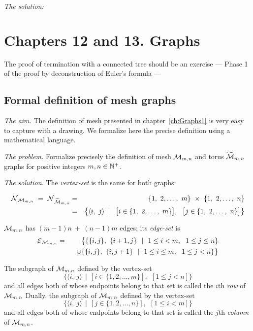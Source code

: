 \noindent \textit{The solution:}





\section{Chapters 12 and 13. Graphs}


{\Arny The proof of termination with a connected tree should be an
  exercise --- Phase 1 of the proof by deconstruction of Euler's
  formula} ---


\subsection{Formal definition of mesh graphs}
\label{Exercice:FormalDefinitionMesh}

\noindent \textit{The aim.}
The definition of mesh presented in chapter~\ref{ch:Graphs1}
is very easy to capture with a drawing.
We formalize here the precise definition using a mathematical language. 
\medskip

\noindent \textit{The problem.}
Formalize precisely the definition of mesh  $\mbox{$\cal M$}_{m,n}$ and torus $\widetilde{\mbox{$\cal M$}}_{m,n}$ graphs
for positive integers $m, n \in \mathbb{N}^+$.
\medskip

\noindent \textit{The solution.}
The  {\it vertex-set} is the same for both graphs:

\begin{eqnarray*}
\n_{\fm_{m,n}} \ = \ \n_{\widetilde{\fm}_{m,n}}
  & = & 
\{1, \ 2, \ldots, \ m\} \ \times \ \{1, \ 2, \ldots, \ n\} \\
  & = & 
\big\{ \langle i, \ j \rangle \ \ | \ \ 
\big[ i \in \{1, \ 2, \ldots, \ m\} \big], \ \
\big[ j \in \{1, \ 2, \ldots, \ n\} \big]
\big\}
\end{eqnarray*}


$\mbox{$\cal M$}_{m,n}$ has $(m-1)n \ + \ (n-1)m$ edges; its {\it edge-set} is
\begin{eqnarray*}
\mbox{$\cal E$}_{\mbox{{\scriptsize $\cal M$}}_{m,n}} & = & 
\big\{
\{ \{ i, j \}, \ \{ i+1, j \} \ \ | \ \
1 \leq i < m, \ \ 1 \leq j \leq n \} \\
  &  & \hspace*{.1in} \cup
\{ \{ i, j \}, \ \{ i, j+1 \} \ \ | \ \
1 \leq i \leq m, \ \ 1 \leq j < n \}
\big\}
\end{eqnarray*}

\medskip

The subgraph of $\mbox{$\cal M$}_{m,n}$ defined by the vertex-set
\[ \{ \langle i, \ j \rangle  \ \ | \ \ \left[i \in \{1, 2, \ldots,
  m\}\right], \ \ \left[1 \leq j < n\right]\}
\]
and all edges both of whose endpoints belong to that set is called the
$i$th {\it row} of $\mbox{$\cal M$}_{m,n}$
Dually, the subgraph of $\mbox{$\cal M$}_{m,n}$ defined by the vertex-set
\[ \{ \langle i, \ j \rangle  \ \ | \ \ \left[j \in \{1, 2, \ldots,
  n\}\right], \ \ \left[1 \leq i < m\right] \}
\]
and all edges both of whose endpoints belong to that set is called the
$j$th {\it column} of $\mbox{$\cal M$}_{m,n}$.


